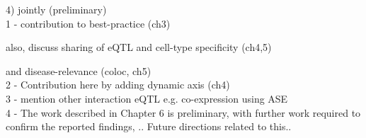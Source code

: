 4) jointly (preliminary)\\

1 - contribution to best-practice (ch3)

also, discuss sharing of eQTL and cell-type specificity (ch4,5)

and disease-relevance (coloc, ch5)\\

2 - Contribution here by adding dynamic axis (ch4)
\cite{francesconi2014effects, strober2019dynamic}\\

3 - mention other interaction eQTL e.g. co-expression \cite{zhernakova2017identification}
using ASE \cite{knowles2017allele}\\

4 - The work described in Chapter 6 is preliminary, with further work required to confirm the reported findings, ..
Future directions related to this..









